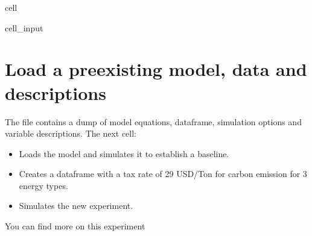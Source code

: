 \documentclass[letterpaper,10pt,english]{jupyterBook}
\begin{document}
\begin{sphinxuseclass}{cell}\begin{sphinxVerbatimInput}

\begin{sphinxuseclass}{cell_input}
\begin{sphinxVerbatim}[commandchars=\\\{\}]
    
\end{sphinxVerbatim}

\end{sphinxuseclass}\end{sphinxVerbatimInput}

\end{sphinxuseclass}

\section{Load a pre\sphinxhyphen{}existing model, data and descriptions}
\label{\detokenize{content/howto/structure/Logical_structure:load-a-pre-existing-model-data-and-descriptions}}
\sphinxAtStartPar
The file  contains a dump of model equations, dataframe, simulation options and variable descriptions.
The next cell:
\begin{itemize}
\item {} 
\sphinxAtStartPar
Loads the model and simulates it to establish a baseline.

\item {} 
\sphinxAtStartPar
Creates a dataframe with a tax rate of 29 USD/Ton for carbon emission for 3 energy types.

\item {} 
\sphinxAtStartPar
Simulates the new experiment.

\end{itemize}

\sphinxAtStartPar
You can find more on this experiment {\hyperref[\detokenize{content/howto/experiments/create_experiment::doc}]{}}
\end{document}
